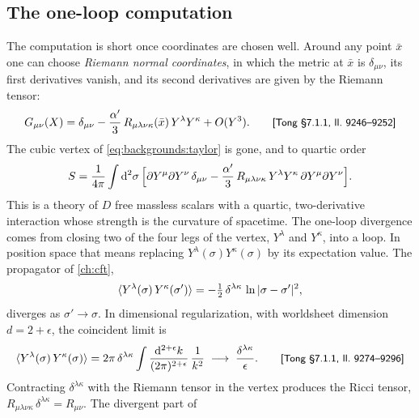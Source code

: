 \subsection{The one-loop computation}

The computation is short once coordinates are chosen well. Around any point $\bar x$ one can
choose \emph{Riemann normal coordinates}, in which the
metric at $\bar x$ is $\delta_{\mu\nu}$, its first derivatives vanish, and its second
derivatives are given by the Riemann tensor:
\begin{equation}\label{eq:backgrounds:rnc}
  G_{\mu\nu}(X)=\delta_{\mu\nu}-\frac{\alpha'}{3}\,R_{\mu\lambda\nu\kappa}(\bar x)\,
  Y^\lambda Y^\kappa+O(Y^3).
  \qquad\text{{\small\textsf{[Tong §7.1.1, ll.~9246--9252]}}}
\end{equation}
The cubic vertex of \eqref{eq:backgrounds:taylor} is gone, and to quartic order
\begin{equation}\label{eq:backgrounds:quartic}
  S=\frac{1}{4\pi}\int\mathrm{d}^2\sigma\,\Bigl[\partial Y^\mu\partial Y^\nu\,\delta_{\mu\nu}
  -\frac{\alpha'}{3}\,R_{\mu\lambda\nu\kappa}\,Y^\lambda Y^\kappa\,
  \partial Y^\mu\partial Y^\nu\Bigr].
\end{equation}
This is a theory of $D$ free massless scalars with a quartic, two-derivative interaction
whose strength is the curvature of spacetime. The one-loop divergence comes from closing two
of the four legs of the vertex, $Y^\lambda$ and $Y^\kappa$, into a loop. In position space
that means replacing $Y^\lambda(\sigma)Y^\kappa(\sigma)$ by its expectation value. The
propagator of \cref{ch:cft},
\begin{equation}\label{eq:backgrounds:prop}
  \langle Y^\lambda(\sigma)\,Y^\kappa(\sigma')\rangle=-\tfrac12\,\delta^{\lambda\kappa}\,
  \ln|\sigma-\sigma'|^2 ,
\end{equation}
diverges as $\sigma'\to\sigma$. In dimensional regularization, with worldsheet dimension
$d=2+\epsilon$, the coincident limit is
\begin{equation}\label{eq:backgrounds:pole}
  \langle Y^\lambda(\sigma)\,Y^\kappa(\sigma)\rangle
  =2\pi\,\delta^{\lambda\kappa}\int\frac{\mathrm{d}^{2+\epsilon}k}{(2\pi)^{2+\epsilon}}\,
  \frac{1}{k^2}\;\longrightarrow\;\frac{\delta^{\lambda\kappa}}{\epsilon}.
  \qquad\text{{\small\textsf{[Tong §7.1.1, ll.~9274--9296]}}}
\end{equation}
Contracting $\delta^{\lambda\kappa}$ with the Riemann tensor in the vertex produces the Ricci
tensor, $R_{\mu\lambda\nu\kappa}\,\delta^{\lambda\kappa}=R_{\mu\nu}$. The divergent part of
